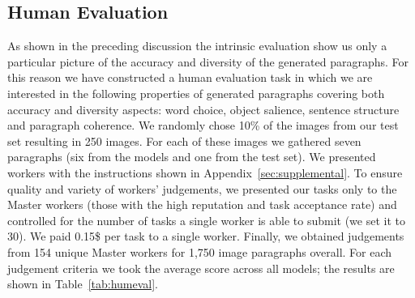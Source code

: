 \documentclass[11pt,a4paper]{article}
\begin{document}
\subsection{Human Evaluation}
\label{humaneval}
As shown in the preceding discussion the intrinsic evaluation show us only a particular picture of the accuracy and diversity of the generated paragraphs.
For this reason we have constructed a human evaluation task in which we are interested in the following properties of generated paragraphs covering both accuracy and diversity aspects: word choice, object salience, sentence structure and paragraph coherence.
We randomly chose 10\% of the images from our test set resulting in 250 images.
For each of these images we gathered seven paragraphs (six from the models and one from the test set).
We presented workers with the instructions shown in Appendix~\ref{sec:supplemental}.
To ensure quality and variety of workers' judgements, we presented our tasks only to the Master workers (those with the high reputation and task acceptance rate) and controlled for the number of tasks a single worker is able to submit (we set it to 30). %
We paid 0.15\$ per task to a single worker.
Finally, we obtained judgements from 154 unique Master workers for 1,750 image paragraphs overall.
For each judgement criteria we took the average score across all models; the results are shown in Table~\ref{tab:humeval}.

\end{document}
